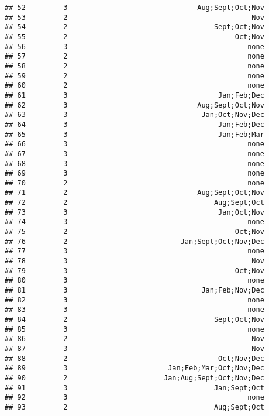 \documentclass[
]{article}
\begin{document}
\begin{verbatim}
## 52         3                               Aug;Sept;Oct;Nov
## 53         2                                            Nov
## 54         2                                   Sept;Oct;Nov
## 55         2                                        Oct;Nov
## 56         3                                           none
## 57         2                                           none
## 58         2                                           none
## 59         2                                           none
## 60         2                                           none
## 61         3                                    Jan;Feb;Dec
## 62         3                               Aug;Sept;Oct;Nov
## 63         3                                Jan;Oct;Nov;Dec
## 64         3                                    Jan;Feb;Dec
## 65         3                                    Jan;Feb;Mar
## 66         3                                           none
## 67         3                                           none
## 68         3                                           none
## 69         3                                           none
## 70         2                                           none
## 71         2                               Aug;Sept;Oct;Nov
## 72         2                                   Aug;Sept;Oct
## 73         3                                    Jan;Oct;Nov
## 74         3                                           none
## 75         2                                        Oct;Nov
## 76         2                           Jan;Sept;Oct;Nov;Dec
## 77         3                                           none
## 78         3                                            Nov
## 79         3                                        Oct;Nov
## 80         3                                           none
## 81         3                                Jan;Feb;Nov;Dec
## 82         3                                           none
## 83         3                                           none
## 84         2                                   Sept;Oct;Nov
## 85         3                                           none
## 86         2                                            Nov
## 87         3                                            Nov
## 88         2                                    Oct;Nov;Dec
## 89         3                        Jan;Feb;Mar;Oct;Nov;Dec
## 90         2                       Jan;Aug;Sept;Oct;Nov;Dec
## 91         3                                   Jan;Sept;Oct
## 92         3                                           none
## 93         2                                   Aug;Sept;Oct

\end{verbatim}
\end{document}
